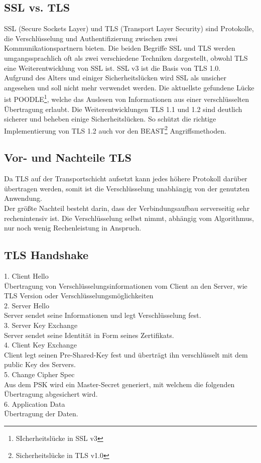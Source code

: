

\subsection{SSL vs. TLS}
SSL (Secure Sockets Layer) und TLS (Transport Layer Security) sind Protokolle, die Verschlüsselung und Authentifizierung zwischen zwei Kommunikationspartnern bieten. Die beiden Begriffe SSL und TLS werden umgangssprachlich oft als zwei verschiedene Techniken dargestellt, obwohl TLS eine Weiterentwicklung von SSL ist. SSL v3 ist die Basis von TLS 1.0. \\
Aufgrund des Alters und einiger Sicherheitslücken wird SSL als unsicher angesehen und soll nicht mehr verwendet werden. Die aktuellste gefundene Lücke ist POODLE\footnote{SIcherheitslücke in SSL v3}, welche das Auslesen von Informationen aus einer verschlüsselten Übertragung erlaubt. Die Weiterentwicklungen TLS 1.1 und 1.2 sind deutlich sicherer und beheben einige Sicherheitslücken. So schützt die richtige Implementierung von TLS 1.2 auch vor den BEAST\footnote{Sicherheitslücke in TLS v1.0} Angriffsmethoden.\\

\subsection{Vor- und Nachteile TLS}
Da TLS auf der Transportschicht aufsetzt kann jedes höhere Protokoll darüber übertragen werden, somit ist die Verschlüsselung unabhängig von der genutzten Anwendung. \\
	Der größte Nachteil besteht darin, dass der Verbindungsaufbau serverseitig sehr rechenintensiv ist. Die Verschlüsselung selbst nimmt, abhängig vom Algorithmus, nur noch wenig Rechenleistung in Anspruch. \\

\subsection{TLS Handshake}
1. Client Hello\\
Übertragung von Verschlüsselungsinformationen vom Client an den Server, wie TLS Version oder Verschlüsselungsmöglichkeiten\\
2. Server Hello \\
Server sendet seine Informationen und legt Verschlüsselung fest. \\
3. Server Key Exchange\\
Server sendet seine Identität in Form seines Zertifikats. \\
4. Client Key Exchange\\
Client legt seinen Pre-Shared-Key fest und überträgt ihn verschlüsselt mit dem public Key des Servers.\\
5. Change Cipher Spec\\
Aus dem PSK wird ein Master-Secret generiert, mit welchem die folgenden Übertragung abgesichert wird. \\
6. Application Data\\
Übertragung der Daten. \\

